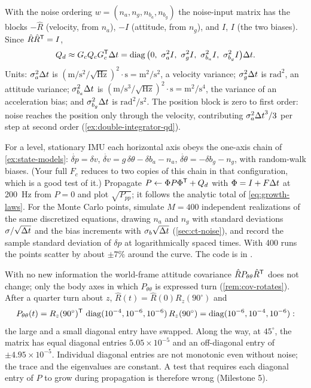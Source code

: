 \begin{solutions}
  \item \ifsolutions
        With the noise ordering $w = (n_a, n_g, n_{b_a}, n_{b_g})$ the noise-input matrix has the blocks $-\hat R$ (velocity, from $n_a$), $-I$ (attitude, from $n_g$), and $I$, $I$
        (the two biases). Since $\hat R\hat R^{\mathsf{T}} = I$,
        \[
          Q_d \approx G_cQ_cG_c\T\Dt = \diag\big(0,\ \sigma_a^2I,\ \sigma_g^2I,\ \sigma_{b_a}^2I,\ \sigma_{b_g}^2I\big)\Dt .
        \]
        Units: $\sigma_a^2{\Delta t}$ is $(\mathrm{m/s^2/\sqrt{Hz}})^2\cdot\mathrm s = \mathrm{m^2/s^2}$, a velocity variance; $\sigma_g^2{\Delta t}$ is $\mathrm{rad^2}$, an attitude variance;
        $\sigma_{b_a}^2{\Delta t}$ is $(\mathrm{m/s^3/\sqrt{Hz}})^2\cdot\mathrm s = \mathrm{m^2/s^4}$, the variance of an acceleration bias; and $\sigma_{b_g}^2{\Delta t}$ is $\mathrm{rad^2/s^2}$. The position block is
        zero to first order: noise reaches the position only through the velocity, contributing $\sigma_a^2{\Delta t}^3/3$ per step at second order
        (\cref{ex:double-integrator-qd}).
        \else\withheldsolution\fi

  \item For a level, stationary IMU each horizontal axis obeys the one-axis chain of \cref{ex:state-models}: $\dot{\delta p} = \delta v$,
        $\dot{\delta v} = g\,\delta\theta - \delta b_a - n_a$, $\dot{\delta\theta} = -\delta b_g - n_g$, with random-walk biases. (Your full $F_c$ reduces to two copies of this chain in
        that configuration, which is a good test of it.) Propagate $P \gets \Phi P\Phi^{\mathsf{T}} + Q_d$ with $\Phi = I + F{\Delta t}$ at 200~Hz from $P = 0$ and plot $\sqrt{P_{pp}}$; it
        follows the analytic total of \eqref{eq:growth-laws}. For the Monte Carlo points, simulate $M = 400$ independent realizations of the same
        discretized equations, drawing $n_a$ and $n_g$ with standard deviations $\sigma/\sqrt{{\Delta t}}$ and the bias increments with $\sigma_b\sqrt{{\Delta t}}$
        (\cref{sec:ct-noise}), and record the sample standard deviation of $\delta p$ at logarithmically spaced times. With 400 runs the points scatter by
        about $\pm7\%$ around the curve. The code is  in .

  \item With no new information the world-frame attitude covariance $\hat RP_{\theta\theta}\hat R^{\mathsf{T}}$ does not change; only the body axes in which $P_{\theta\theta}$ is
        expressed turn (\cref{rem:cov-rotates}). After a quarter turn about $z$, $\hat R(t) = \hat R(0)R_z(90^\circ)$ and
        \[
          P_{\theta\theta}(t) = R_z(90^\circ)^{\mathsf{T}}\,\operatorname{diag}(10^{-4}, 10^{-6}, 10^{-6})\,R_z(90^\circ) = \operatorname{diag}(10^{-6}, 10^{-4}, 10^{-6}):
        \]
        the large and a small diagonal entry have swapped. Along the way, at $45^\circ$, the matrix has equal diagonal entries $5.05\times10^{-5}$ and an
        off-diagonal entry of $\pm4.95\times10^{-5}$. Individual diagonal entries are not monotonic even without noise; the trace and the eigenvalues are constant.
        A test that requires each diagonal entry of $P$ to grow during propagation is therefore wrong (Milestone 5).


\end{solutions}

